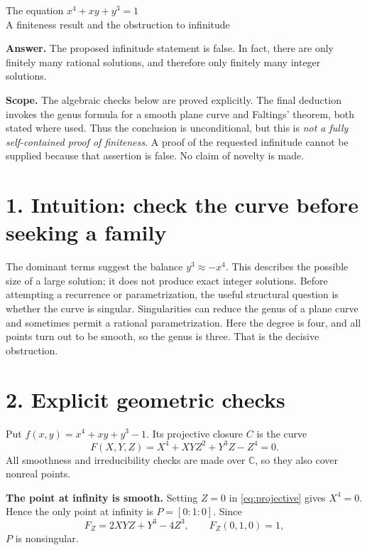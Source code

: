 \documentclass[11pt,a4paper]{article}
\begin{document}
\begin{center}
  {\LARGE The equation $x^4+xy+y^3=1$}\\[5pt]
  {\large A finiteness result and the obstruction to infinitude}
\end{center}
\vspace{2pt}

\textbf{Answer.} The proposed infinitude statement is false. In fact, there
are only finitely many rational solutions, and therefore only finitely many
integer solutions.

\textbf{Scope.} The algebraic checks below are
proved explicitly. The final deduction invokes the genus formula for a smooth
plane curve and Faltings' theorem, both stated where used. Thus the conclusion
is unconditional, but this is \emph{not a fully self-contained proof of
finiteness}. A proof of the requested infinitude cannot be supplied because
that assertion is false. No claim of novelty is made.

\section*{1. Intuition: check the curve before seeking a family}

The dominant terms suggest the balance $y^3\approx -x^4$. This describes
the possible size of a large solution; it does not produce exact integer
solutions. Before attempting a recurrence or parametrization, the useful
structural question is whether the curve is singular. Singularities can
reduce the genus of a plane curve and sometimes permit a rational
parametrization. Here the degree is four, and all points turn out to be
smooth, so the genus is three. That is the decisive obstruction.

\section*{2. Explicit geometric checks}

Put $f(x,y)=x^4+xy+y^3-1$. Its projective closure $C$ is the curve
\begin{equation}
 F(X,Y,Z)=X^4+XYZ^2+Y^3Z-Z^4=0.
 \label{eq:projective}
\end{equation}
All smoothness and irreducibility checks are made over $\mathbb C$,
so they also cover nonreal points.

\textbf{The point at infinity is smooth.}
Setting $Z=0$ in \eqref{eq:projective} gives $X^4=0$. Hence the only point
at infinity is $P=[0:1:0]$. Since
\[
 F_Z=2XYZ+Y^3-4Z^3,\qquad F_Z(0,1,0)=1,
\]
$P$ is nonsingular.
\end{document}

